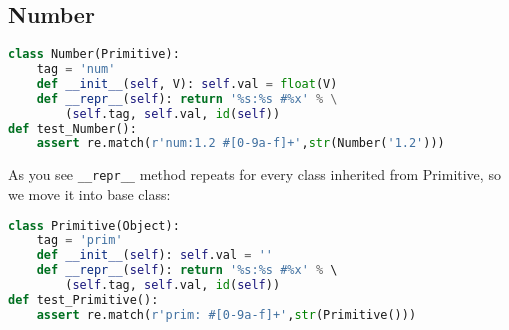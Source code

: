 \subsection{Number}


\begin{lstlisting}[language=Python]
class Number(Primitive):
    tag = 'num'
    def __init__(self, V): self.val = float(V)
    def __repr__(self): return '%s:%s #%x' % \
    	(self.tag, self.val, id(self))
def test_Number():
    assert re.match(r'num:1.2 #[0-9a-f]+',str(Number('1.2')))
\end{lstlisting}
As you see \verb|__repr__| method repeats for every class inherited from
Primitive, so we move it into base class:

\begin{lstlisting}[language=Python]
class Primitive(Object):
    tag = 'prim'
    def __init__(self): self.val = ''
    def __repr__(self): return '%s:%s #%x' % \ 
    	(self.tag, self.val, id(self))
def test_Primitive():
    assert re.match(r'prim: #[0-9a-f]+',str(Primitive()))
\end{lstlisting}
 
